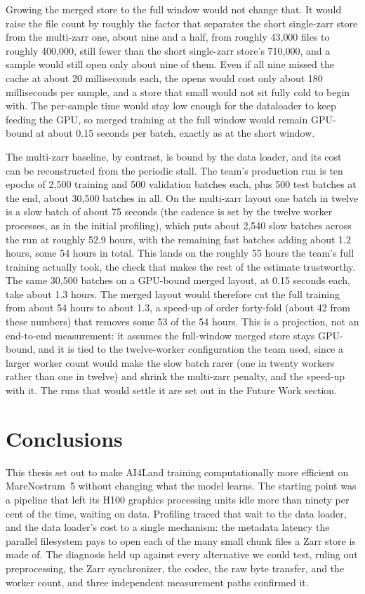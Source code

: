 \documentclass[12pt,a4paper]{article}
\begin{document}
Growing the merged store to the full window would not change that. It would raise the file count
by roughly the factor that separates the short single-zarr store from the multi-zarr one, about
nine and a half, from roughly 43{,}000 files to roughly 400{,}000, still fewer than the short
single-zarr store's 710{,}000, and a sample would still open only about nine of them. Even if all
nine missed the cache at about 20 milliseconds each, the opens would cost only about 180
milliseconds per sample, and a store that small would not sit fully cold to begin with. The
per-sample time would stay low enough for the dataloader to keep feeding the GPU, so merged
training at the full window would remain GPU-bound at about 0.15 seconds per batch, exactly as at
the short window.

The multi-zarr baseline, by contrast, is bound by the data loader, and its cost can be
reconstructed from the periodic stall. The team's production run is ten epochs of 2{,}500
training and 500 validation batches each, plus 500 test batches at the end, about 30{,}500
batches in all. On the multi-zarr layout one batch in twelve is a slow batch of about 75 seconds
(the cadence is set by the twelve worker processes, as in the initial profiling), which puts
about 2{,}540 slow batches across the run at roughly 52.9 hours, with the remaining fast batches
adding about 1.2 hours, some 54 hours in total. This lands on the roughly 55 hours the team's
full training actually took, the check that makes the rest of the estimate trustworthy. The same
30{,}500 batches on a GPU-bound merged layout, at 0.15 seconds each, take about 1.3 hours. The
merged layout would therefore cut the full training from about 54 hours to about 1.3, a speed-up
of order forty-fold (about 42 from these numbers) that removes some 53 of the 54 hours. This is a
projection, not an end-to-end measurement: it assumes the full-window merged store stays
GPU-bound, and it is tied to the twelve-worker configuration the team used, since a larger worker
count would make the slow batch rarer (one in twenty workers rather than one in twelve) and
shrink the multi-zarr penalty, and the speed-up with it. The runs that would settle it are set
out in the Future Work section.

\section{Conclusions}

This thesis set out to make AI4Land training computationally more efficient on MareNostrum~5
without changing what the model learns. The starting point was a pipeline that left its H100
graphics processing units idle more than ninety per cent of the time, waiting on data.
Profiling traced that wait to the data loader, and the data loader's cost to a single
mechanism: the metadata latency the parallel filesystem pays to open each of the many small
chunk files a Zarr store is made of. The diagnosis held up against every alternative we could
test, ruling out preprocessing, the Zarr synchronizer, the codec, the raw byte transfer, and
the worker count, and three independent measurement paths confirmed it.
\end{document}
